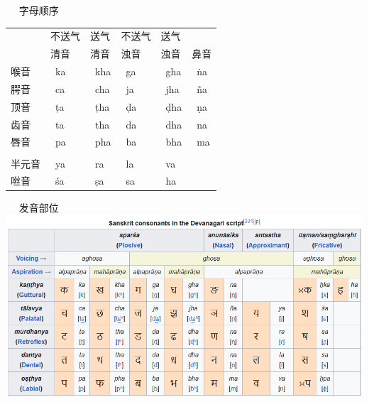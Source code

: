 \documentclass[17pt]{beamer}
\newcommand{\skt}[1]{{\sanskritfont{#1}}} %
\newcommand{\skttrans}[1]{{\skt{#1}~#1}}  %
\begin{document}
\begin{frame}{\insertsubsection ~~ 字母顺序}
  \small
  \begin{tabular}{@{}llllll@{}} %
     & 不送气  & 送气 & 不送气 & 送气 &   \\
     & 清音  & 清音 & 浊音 & 浊音 & 鼻音  \\
    喉音  & \skttrans{ka}  & \skttrans{kha} & \skttrans{ga} & \skttrans{gha} & \skttrans{ṅa} \\
    腭音  & \skttrans{ca}  & \skttrans{cha} & \skttrans{ja} & \skttrans{jha} & \skttrans{ña} \\
    顶音  & \skttrans{ṭa}  & \skttrans{ṭha} & \skttrans{ḍa} & \skttrans{ḍha} & \skttrans{ṇa} \\
    齿音  & \skttrans{ta}  & \skttrans{tha} & \skttrans{da} & \skttrans{dha} & \skttrans{na} \\
    唇音  & \skttrans{pa}  & \skttrans{pha} & \skttrans{ba} & \skttrans{bha} & \skttrans{ma} \\
      &  & &  & &   \\
    半元音  & \skttrans{ya}  & \skttrans{ra} & \skttrans{la} & \skttrans{va} &  \\
    咝音  & \skttrans{śa}  & \skttrans{ṣa} & \skttrans{sa} &  \skttrans{ha} & \\
  \end{tabular}
\end{frame}

\begin{frame}{\insertsubsection ~~ 发音部位}
    \centering    
    \includegraphics[width=\textwidth]{consonant_system.png}
\end{frame}
\end{document}
